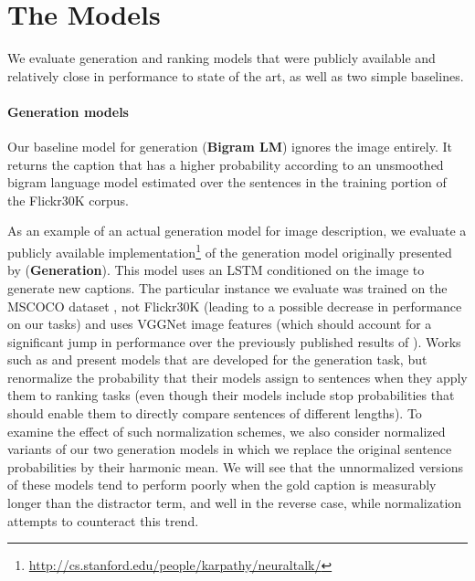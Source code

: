 \documentclass[11pt]{article}
\begin{document}
\section{The Models}
\label{sec:models}

We evaluate generation and ranking models that were publicly available and relatively close in performance to state of the art, as well as two simple baselines.

\paragraph{Generation models} Our baseline model for generation (\textbf{Bigram LM}) ignores the image entirely. It returns the caption that has a higher probability according to an unsmoothed bigram language model estimated over the sentences in the training portion of the Flickr30K corpus. 

As an example of an actual generation model for image description, we evaluate a publicly available implementation\footnote{\tiny\url{http://cs.stanford.edu/people/karpathy/neuraltalk/}} of the generation model originally presented by  (\textbf{Generation}). This model uses an LSTM \cite{Hochreiter:1997:LSM:1246443.1246450} conditioned on the image to generate new captions. The particular instance we evaluate
was trained on the MSCOCO dataset \cite{LMBHPRDZ:ECCV:2014}, not Flickr30K (leading to a possible decrease in performance on our tasks) and uses VGGNet \cite{Simonyan14c} image features (which should account for a significant jump in performance over the previously published results of ).
 Works such as  and  present models that are developed for the generation task, but renormalize the probability that their models assign to sentences when they apply them to ranking tasks (even though their models include stop probabilities that should enable them to directly compare sentences of different lengths).  To examine the effect of such normalization schemes, we also consider normalized variants of our two generation models in which we replace the original sentence probabilities by their  harmonic mean.
We will see that the unnormalized versions of these models tend to perform poorly when the gold caption is measurably
longer than the distractor term, and well in the reverse case, while normalization attempts to counteract this trend.
\end{document}
